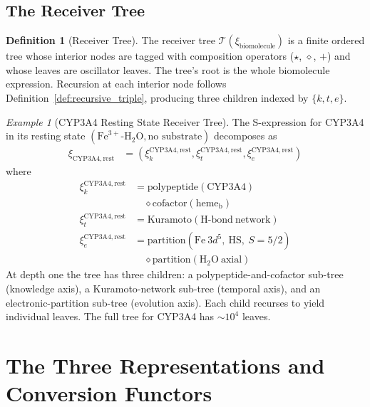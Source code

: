 \documentclass[11pt,twocolumn,a4paper]{article}
\theoremstyle{definition}
\newtheorem{definition}[theorem]{Definition}
\theoremstyle{remark}
\newtheorem{example}[theorem]{Example}
\newcommand{\Sexp}{\xi}
\newcommand{\Tree}{\mathcal{T}}
\begin{document}
\subsection{The Receiver Tree}

\begin{definition}[Receiver Tree]
\label{def:receiver_tree}
The receiver tree $\Tree(\Sexp_{\mathrm{biomolecule}})$ is a finite ordered tree whose interior nodes are tagged with composition operators ($\star$, $\diamond$, $+$) and whose leaves are oscillator leaves. The tree's root is the whole biomolecule expression. Recursion at each interior node follows Definition~\ref{def:recursive_triple}, producing three children indexed by $\{k, t, e\}$.
\end{definition}

\begin{example}[CYP3A4 Resting State Receiver Tree]
\label{ex:cyp3a4_tree}
The S-expression for CYP3A4 in its resting state $(\mathrm{Fe}^{3+}\text{-H}_2\mathrm{O}, \text{no substrate})$ decomposes as
\begin{align*}
\Sexp_{\mathrm{CYP3A4,rest}} &= (\Sexp_k^{\mathrm{CYP3A4,rest}}, \Sexp_t^{\mathrm{CYP3A4,rest}}, \Sexp_e^{\mathrm{CYP3A4,rest}})
\end{align*}
where
\begin{align*}
\Sexp_k^{\mathrm{CYP3A4,rest}} &= \mathrm{polypeptide(CYP3A4)} \\
&\quad \diamond \mathrm{cofactor}(\mathrm{heme}_{\mathrm{b}}) \\
\Sexp_t^{\mathrm{CYP3A4,rest}} &= \mathrm{Kuramoto}(\mathrm{H\text{-}bond\ network}) \\
\Sexp_e^{\mathrm{CYP3A4,rest}} &= \mathrm{partition}(\mathrm{Fe}\ 3d^5,\ \mathrm{HS},\ S=5/2) \\
&\quad \diamond \mathrm{partition}(\mathrm{H_2O\ axial})
\end{align*}
At depth one the tree has three children: a polypeptide-and-cofactor sub-tree (knowledge axis), a Kuramoto-network sub-tree (temporal axis), and an electronic-partition sub-tree (evolution axis). Each child recurses to yield individual leaves. The full tree for CYP3A4 has $\sim 10^4$ leaves.
\end{example}

\section{The Three Representations and Conversion Functors}
\label{sec:representations}
\end{document}
